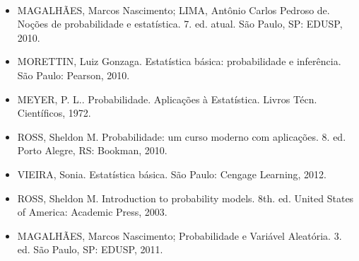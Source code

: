 \documentclass[11pt,a4paper]{report}
\begin{document}
\\

\begin{itemize}
     \item MAGALHÃES, Marcos Nascimento; LIMA, Antônio Carlos Pedroso de. Noções de probabilidade e estatística. 7. ed. atual. São Paulo, SP: EDUSP, 2010.
     
     \item MORETTIN, Luiz Gonzaga. Estatística básica: probabilidade e inferência. São Paulo: Pearson, 2010.
     
     \item MEYER, P. L.. Probabilidade. Aplicações à Estatística. Livros Técn. Científicos, 1972.
     
     \item ROSS, Sheldon M. Probabilidade: um curso moderno com aplicações. 8. ed. Porto Alegre, RS: Bookman, 2010.
     
     \item VIEIRA, Sonia. Estatística básica. São Paulo: Cengage Learning, 2012.
     
\end{itemize}

\begin{itemize}
    \item ROSS, Sheldon M. Introduction to probability models. 8th. ed. United States of America: Academic Press, 2003.
    
    \item MAGALHÃES, Marcos Nascimento; Probabilidade e Variável Aleatória. 3. ed. São Paulo, SP: EDUSP, 2011.
\end{itemize}
\end{document}
